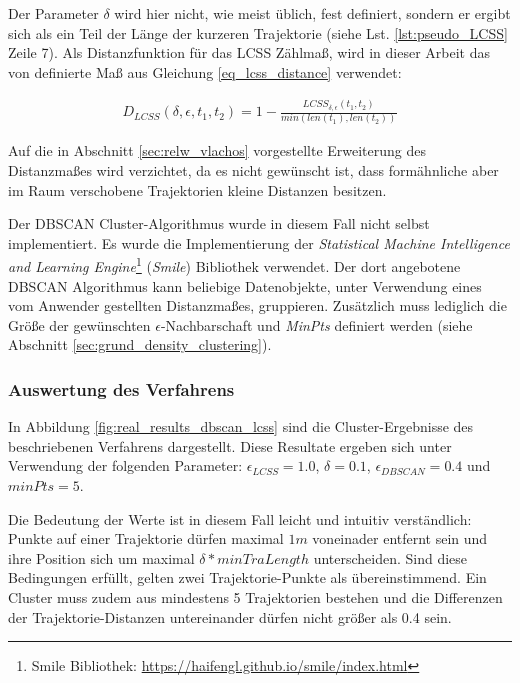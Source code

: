 Der Parameter $\delta$ wird hier nicht, wie meist üblich, fest definiert, sondern er ergibt sich als
ein Teil der Länge der kurzeren Trajektorie (siehe Lst. \ref{lst:pseudo_LCSS} Zeile 7).
Als Distanzfunktion für das LCSS Zählmaß, wird in dieser Arbeit das von \cite[]{Vlachos2002} definierte
Maß aus Gleichung \ref{eq_lcss_distance} verwendet:

\begin{ceqn}
\begin{align*}
    D_{LCSS}(\delta, \epsilon, t_1, t_2) = 1 - \frac{LCSS_{\delta, \epsilon}(t_1, t_2)}{min(len(t_1), len(t_2))}
\end{align*}
\end{ceqn}

Auf die in Abschnitt \ref{sec:relw_vlachos} vorgestellte Erweiterung des Distanzmaßes wird verzichtet,
da es nicht gewünscht ist, dass formähnliche aber im Raum verschobene Trajektorien kleine Distanzen besitzen.

Der DBSCAN Cluster-Algorithmus wurde in diesem Fall nicht selbst implementiert. Es wurde die Implementierung
der \textit{Statistical Machine Intelligence and Learning Engine}\footnote{Smile Bibliothek: \url{https://haifengl.github.io/smile/index.html}}
(\textit{Smile}) Bibliothek verwendet. Der dort angebotene DBSCAN Algorithmus kann beliebige Datenobjekte, unter Verwendung eines
vom Anwender gestellten Distanzmaßes, gruppieren. Zusätzlich muss lediglich die Größe der gewünschten
$\epsilon$-Nachbarschaft und \textit{MinPts} definiert werden (siehe Abschnitt \ref{sec:grund_density_clustering}).

\subsubsection{Auswertung des Verfahrens}
\label{sec:results_clustering_dbscan_lcss}

In Abbildung \ref{fig:real_results_dbscan_lcss} sind die Cluster-Ergebnisse des beschriebenen Verfahrens
dargestellt. Diese Resultate ergeben sich unter Verwendung der folgenden Parameter:
$\epsilon_{LCSS} = 1.0$, $\delta = 0.1$, $\epsilon_{DBSCAN} = 0.4$ und $minPts = 5$.

Die Bedeutung der Werte ist in diesem Fall leicht und intuitiv verständlich: Punkte auf einer Trajektorie
dürfen maximal $1m$ voneinader entfernt sein und ihre Position sich um maximal $\delta * minTraLength$ unterscheiden.
Sind diese Bedingungen erfüllt, gelten zwei Trajektorie-Punkte als übereinstimmend. Ein Cluster muss zudem aus mindestens
5 Trajektorien bestehen und die Differenzen der Trajektorie-Distanzen untereinander dürfen nicht größer als 0.4 sein.


